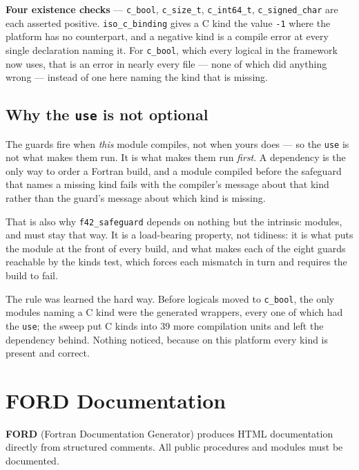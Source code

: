 \documentclass{article}
\begin{document}
\textbf{Four existence checks} --- \texttt{c\_bool}, \texttt{c\_size\_t}, \texttt{c\_int64\_t},
\texttt{c\_signed\_char} are each asserted positive. \texttt{iso\_c\_binding} gives a C kind the
value \texttt{-1} where the platform has no counterpart, and a negative kind is a compile error
at every single declaration naming it. For \texttt{c\_bool}, which every logical in the framework
now uses, that is an error in nearly every file --- none of which did anything wrong --- instead of
one here naming the kind that is missing.

\subsection{Why the \texttt{use} is not optional}

The guards fire when \emph{this} module compiles, not when yours does --- so the \texttt{use} is
not what makes them run. It is what makes them run \emph{first}. A dependency is the only way to
order a Fortran build, and a module compiled before the safeguard that names a missing kind
fails with the compiler's message about that kind rather than the guard's message about which
kind is missing.

That is also why \texttt{f42\_safeguard} depends on nothing but the intrinsic modules, and must
stay that way. It is a load-bearing property, not tidiness: it is what puts the module at the
front of every build, and what makes each of the eight guards reachable by the kinds test, which
forces each mismatch in turn and requires the build to fail.

The rule was learned the hard way. Before logicals moved to \texttt{c\_bool}, the only modules
naming a C kind were the generated wrappers, every one of which had the \texttt{use}; the sweep
put C kinds into 39 more compilation units and left the dependency behind. Nothing noticed,
because on this platform every kind is present and correct.

\section{FORD Documentation}

\textbf{FORD} (Fortran Documentation Generator) produces HTML documentation directly from structured comments. All public procedures and modules must be documented.
\end{document}
